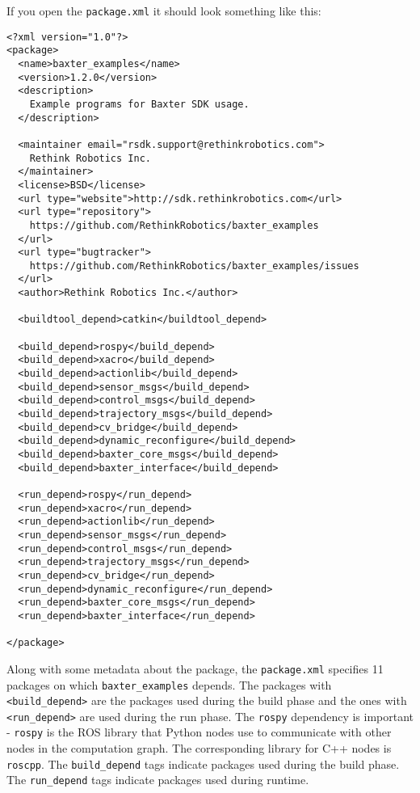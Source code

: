 \documentclass{article}
\begin{document}
If you open the \verb=package.xml= it should look something like this:
\begin{Verbatim}[frame=single]
<?xml version="1.0"?>
<package>
  <name>baxter_examples</name>
  <version>1.2.0</version>
  <description>
    Example programs for Baxter SDK usage.
  </description>

  <maintainer email="rsdk.support@rethinkrobotics.com">
    Rethink Robotics Inc.
  </maintainer>
  <license>BSD</license>
  <url type="website">http://sdk.rethinkrobotics.com</url>
  <url type="repository">
    https://github.com/RethinkRobotics/baxter_examples
  </url>
  <url type="bugtracker">
    https://github.com/RethinkRobotics/baxter_examples/issues
  </url>
  <author>Rethink Robotics Inc.</author>

  <buildtool_depend>catkin</buildtool_depend>

  <build_depend>rospy</build_depend>
  <build_depend>xacro</build_depend>
  <build_depend>actionlib</build_depend>
  <build_depend>sensor_msgs</build_depend>
  <build_depend>control_msgs</build_depend>
  <build_depend>trajectory_msgs</build_depend>
  <build_depend>cv_bridge</build_depend>
  <build_depend>dynamic_reconfigure</build_depend>
  <build_depend>baxter_core_msgs</build_depend>
  <build_depend>baxter_interface</build_depend>

  <run_depend>rospy</run_depend>
  <run_depend>xacro</run_depend>
  <run_depend>actionlib</run_depend>
  <run_depend>sensor_msgs</run_depend>
  <run_depend>control_msgs</run_depend>
  <run_depend>trajectory_msgs</run_depend>
  <run_depend>cv_bridge</run_depend>
  <run_depend>dynamic_reconfigure</run_depend>
  <run_depend>baxter_core_msgs</run_depend>
  <run_depend>baxter_interface</run_depend>

</package>
\end{Verbatim}

Along with some metadata about the package, the \verb=package.xml= specifies 11 packages on which \verb=baxter_examples= depends. The packages with \verb=<build_depend>= are the packages used during the build phase and the ones with \verb=<run_depend>= are used during the run phase. The \verb=rospy= dependency is important - \verb=rospy= is the ROS library that Python nodes use to communicate with other nodes in the computation graph. The corresponding library for C++ nodes is \verb=roscpp=.
The \verb=build_depend= tags indicate packages used during the build phase.
The \verb=run_depend= tags indicate packages used during runtime.

\end{document}
